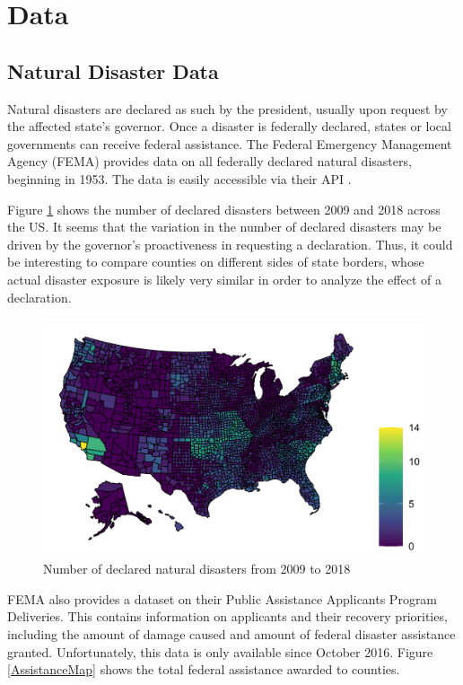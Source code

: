 
\section{Data}

\subsection{Natural Disaster Data}

Natural disasters are declared as such by the president, usually upon request by the affected state's governor. Once a disaster is federally declared, states or local governments can receive federal assistance. The Federal Emergency Management Agency (FEMA) provides data on all federally declared natural disasters, beginning in 1953. The data is easily accessible via their API \citep{rfema}.

Figure \ref{DisasterMap} shows the number of declared disasters between 2009 and 2018 across the US. It seems that the variation in the number of declared disasters may be driven by the governor's proactiveness in requesting a declaration. Thus, it could be interesting to compare counties on different sides of state borders, whose actual disaster exposure is likely very similar in order to analyze the effect of a declaration.


\begin{figure}[!h]
	\centering
	\includegraphics[scale=1]{"../Code & Data/DisasterMap.png"}
	\caption{Number of declared natural disasters from 2009 to 2018}
	\label{DisasterMap}
\end{figure}


FEMA also provides a dataset on  their Public Assistance Applicants Program Deliveries. This contains information on applicants and their recovery priorities, including the amount of damage caused and amount of federal disaster assistance granted. Unfortunately, this data is only available since October 2016. Figure \ref{AssistanceMap} shows the total federal assistance awarded to counties.


